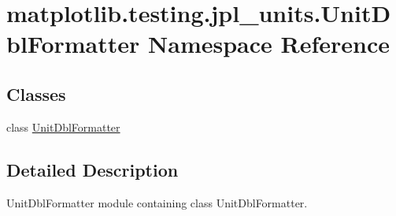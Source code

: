 \hypertarget{namespacematplotlib_1_1testing_1_1jpl__units_1_1UnitDblFormatter}{}\section{matplotlib.\+testing.\+jpl\+\_\+units.\+Unit\+Dbl\+Formatter Namespace Reference}
\label{namespacematplotlib_1_1testing_1_1jpl__units_1_1UnitDblFormatter}
\subsection*{Classes}
\begin{DoxyCompactItemize}
\item 
class \hyperlink{classmatplotlib_1_1testing_1_1jpl__units_1_1UnitDblFormatter_1_1UnitDblFormatter}{Unit\+Dbl\+Formatter}
\end{DoxyCompactItemize}


\subsection{Detailed Description}
\begin{DoxyVerb}UnitDblFormatter module containing class UnitDblFormatter.\end{DoxyVerb}
 